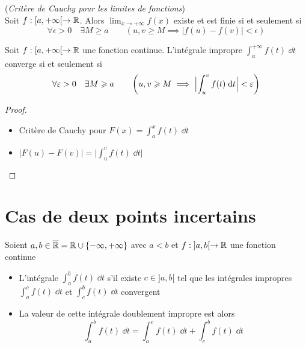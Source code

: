 \begin{frame}

 (\emph{Critère de Cauchy pour les limites de fonctions}) \\
Soit $f : [a,+\infty[ \to \mathbb{R}$. 
Alors $\lim_{x\to +\infty} f(x)$ existe et est finie  si et seulement si 
$$\forall \epsilon>0\quad\exists M \ge a \qquad 
\left( u,v \ge M \implies \big|f(u)-f(v)\big|<\epsilon\right)$$

\pause

 
\begin{theoreme}
\label{th:intimpcauchy}
Soit $f : [a,+\infty[ \to \mathbb{R}$ une fonction continue.
L'intégrale impropre $\int_a^{+\infty} f(t) \; \dd t$ converge
si et seulement si
$$\forall \varepsilon>0  \quad \exists  M \geqslant a \qquad
\left( u,v \geqslant M \implies \Bigl|\int_u^v f(t) \;\text{d} t\Bigr|<\varepsilon\right)$$
\end{theoreme}

\pause

\begin{proof}
\begin{itemize}
  \item Critère de Cauchy pour $F(x)=\int_a^x f(t) \; \dd t$ 
\pause  
  \item $\displaystyle \big|F(u)-F(v)\big|=\big|\int_u^vf(t)\; \dd t\big|$ \qedhere
\end{itemize}
\end{proof}
\end{frame}


\section*{Cas de deux points incertains}

\begin{frame}

Soient $a,b\in \overline{\mathbb{R}}=\mathbb{R}\cup\{-\infty,+\infty\}$ avec $a<b$
et $f : \; ]a,b[ \to \mathbb{R}$ une fonction continue

\pause


\begin{mydefinition}
\begin{itemize}
  \item L'intégrale $\int_a^b f(t)\;\dd t$  s'il existe
$c \in ]a,b[$ tel que les  intégrales
impropres $\int_a^c f(t)\;\dd t$ et $\int_c^b f(t)\;\dd t$ convergent
\pause  
  \item La valeur de cette intégrale doublement impropre est alors
$$\int_a^b f(t)\;\dd t = \int_a^c f(t)\;\dd t+\int_c^b f(t)\;\dd t$$
\end{itemize}
\end{mydefinition} 
\end{frame}


